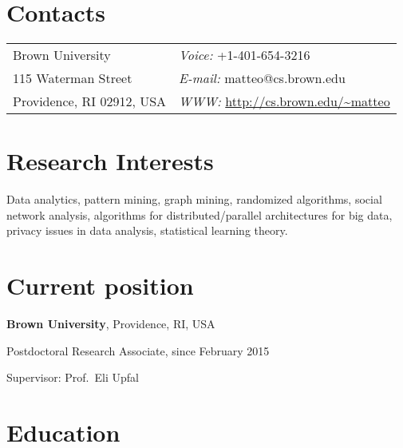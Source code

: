\documentclass[margin,line]{resume}
\newif\ifwebversion
\begin{document}
\begin{resume}

  \section{\sc Contacts}
\vspace{.05in}

	\begin{tabular}{@{}p{2.8in}p{3.2in}}
	Brown University & {\it Voice:} +1-401-654-3216 \\
	115 Waterman Street & {\it E-mail:}  matteo@cs.brown.edu  \\
	Providence, RI 02912, USA &  {\it WWW:} \url{http://cs.brown.edu/~matteo}  \\
	\end{tabular}


\section{\sc Research Interests}

{Data analytics, pattern mining, graph mining, randomized algorithms, social
network analysis, algorithms for distributed/parallel architectures for big
data, privacy issues in data analysis, statistical learning theory.}

\section{\sc Current position}
{\bf Brown University}, Providence, RI, USA\\
\vspace*{-.18in}
\begin{list1}
\item[] Postdoctoral Research Associate, since February 2015
\begin{list2}
\item Supervisor: Prof.~Eli Upfal
\end{list2}
\end{list1}

\section{\sc Education}


\end{resume}
\end{document}
